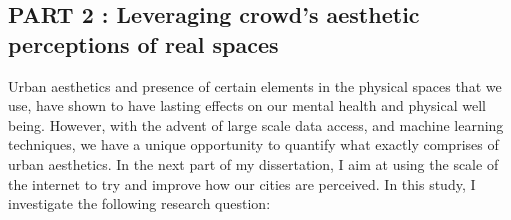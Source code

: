 \subsection{PART 2 : Leveraging crowd's aesthetic perceptions of real spaces}
Urban aesthetics and presence of certain elements in the physical spaces that we use, have shown to have lasting effects on our mental health\cite{seresinhe2017using} and physical well being\cite{ball2001perceived,giles2005increasing}. However, with the advent of large scale data access, and machine learning techniques, we have a unique opportunity to quantify what exactly comprises of urban aesthetics.
In the next part of my dissertation, I aim at using the scale of the internet to try and improve how our cities are perceived. In this study, I investigate the following research question: 
\noindent{}

\noindent{}

\noindent{}
\vspace{0.5cm}

